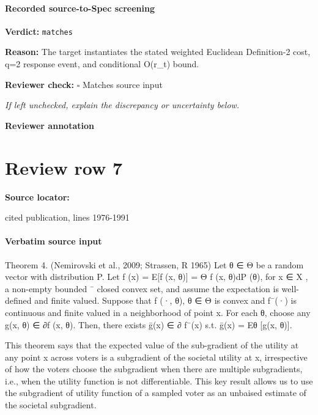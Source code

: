 \documentclass[10pt]{article}
\newcommand{\reviewerbox}{%
  \par\noindent\fbox{\parbox{0.96\linewidth}{\rule{0pt}{0.38in}}}\par
}
\newcommand{\reviewmatch}[1]{%
  \par\noindent\textbf{Reviewer check:} $\square$\; #1\par
  \noindent\emph{If left unchecked, explain the discrepancy or uncertainty below.}\par
}
\begin{document}
\paragraph{Recorded source-to-Spec screening}
\textbf{Verdict:} \texttt{matches}
\\
{\raggedright
\textbf{Reason:} The target instantiates the stated weighted Euclidean Definition-\allowbreak{}2 cost, q=2 response event, and conditional O(r\_\allowbreak{}t) bound.\allowbreak{}
\par}
\reviewmatch{Matches source input}
\noindent\textbf{Reviewer annotation}\par
\reviewerbox
\clearpage
\hypertarget{source-claim-4f41e995c4d500c9}{}
\section*{Review row 7}
\textbf{Source locator:} {\footnotesize\raggedright cited publication, lines 1976-\allowbreak{}1991\par}
\paragraph{Verbatim source input}
\begin{ReviewVerbatim}
Theorem 4. (Nemirovski et al., 2009; Strassen,
                                            R       1965) Let θ ∈ Θ be a random vector with
distribution P. Let f (x) = E[f (x, θ)] = Θ f (x, θ)dP (θ), for x ∈ X , a non-empty bounded
                      ¯
closed convex set, and assume the expectation is well-defined and finite valued. Suppose that
f (·, θ), θ ∈ Θ is convex and f¯(·) is continuous and finite valued in a neighborhood of point
x.
     For each θ, choose any g(x, θ) ∈ ∂f (x, θ). Then, there exists ḡ(x) ∈ ∂ f¯(x) s.t. ḡ(x) =
Eθ [g(x, θ)].


   This theorem says that the expected value of the sub-gradient of the utility at any point
x across voters is a subgradient of the societal utility at x, irrespective of how the voters
choose the subgradient when there are multiple subgradients, i.e., when the utility function
is not differentiable. This key result allows us to use the subgradient of utility function of a
sampled voter as an unbaised estimate of the societal subgradient.
\end{ReviewVerbatim}
\end{document}
